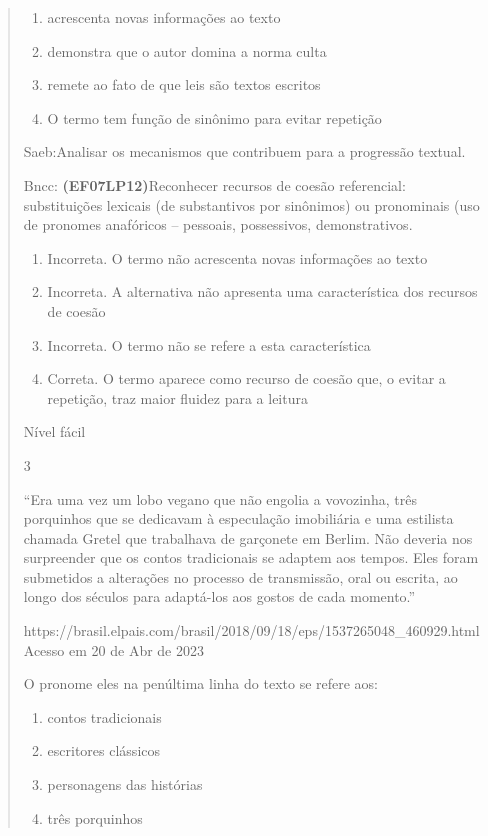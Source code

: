 {\begin{quote}
{\begin{enumerate}

\item
  acrescenta novas informações ao texto
\item
  demonstra que o autor domina a norma culta
\item
  remete ao fato de que leis são textos escritos
\item
  O termo tem função de sinônimo para evitar repetição
\end{enumerate}

Saeb:Analisar os mecanismos que contribuem para a progressão textual.

Bncc: \textbf{(EF07LP12)}Reconhecer recursos de coesão referencial:
substituições lexicais (de substantivos por sinônimos) ou pronominais
(uso de pronomes anafóricos -- pessoais, possessivos, demonstrativos.

\begin{enumerate}
\def\labelenumi{\arabic{enumi}.}
\item
  Incorreta. O termo não acrescenta novas informações ao texto
\item
  Incorreta. A alternativa não apresenta uma característica dos recursos
  de coesão
\item
  Incorreta. O termo não se refere a esta característica
\item
  Correta. O termo aparece como recurso de coesão que, o evitar a
  repetição, traz maior fluidez para a leitura
\end{enumerate}

Nível fácil

\num{3}

``Era uma vez um lobo vegano que não engolia a vovozinha, três
porquinhos que se dedicavam à especulação imobiliária e uma estilista
chamada Gretel que trabalhava de garçonete em Berlim. Não deveria nos
surpreender que os contos tradicionais se adaptem aos tempos. Eles foram
submetidos a alterações no processo de transmissão, oral ou escrita, ao
longo dos séculos para adaptá-los aos gostos de cada momento.''

https://brasil.elpais.com/brasil/2018/09/18/eps/1537265048\_460929.html
Acesso em 20 de Abr de 2023

O pronome eles na penúltima linha do texto se refere aos:

\begin{enumerate}

\item
  contos tradicionais
\item
  escritores clássicos
\item
  personagens das histórias
\item
  três porquinhos
\end{enumerate}

}
\end{quote}}

